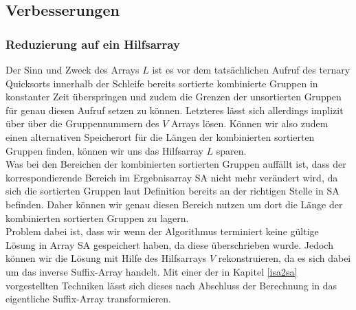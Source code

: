 \subsection{Verbesserungen}
\subsubsection{Reduzierung auf ein Hilfsarray}
Der Sinn und Zweck des Arrays $L$ ist es vor dem tatsächlichen Aufruf des ternary Quicksorts innerhalb der Schleife bereits sortierte kombinierte Gruppen in konstanter Zeit überspringen und zudem die Grenzen der unsortierten Gruppen für genau diesen Aufruf setzen zu können. Letzteres lässt sich allerdings implizit über über die Gruppennummern des $V$ Arrays lösen. Können wir also zudem einen alternativen Speicherort für die Längen der kombinierten sortierten Gruppen finden, können wir uns das Hilfsarray $L$ sparen.\\
Was bei den Bereichen der kombinierten sortierten Gruppen auffällt ist, dass der korrespondierende Bereich im Ergebnisarray SA nicht mehr verändert wird, da sich die sortierten Gruppen laut Definition bereits an der richtigen Stelle in SA befinden. Daher können wir genau diesen Bereich nutzen um dort die Länge der kombinierten sortierten Gruppen zu lagern.\\
Problem dabei ist, dass wir wenn der Algorithmus terminiert keine gültige Lösung in Array SA gespeichert haben, da diese überschrieben wurde. Jedoch können wir die Lösung mit Hilfe des Hilfsarrays $V$ rekonstruieren, da es sich dabei um das inverse Suffix-Array handelt. Mit einer der in Kapitel \ref{isa2sa} vorgestellten Techniken lässt sich dieses nach Abschluss der Berechnung in das eigentliche Suffix-Array transformieren.\\



